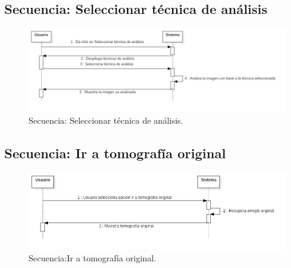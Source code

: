 \documentclass[12pt]{report}
\begin{document}
\subsection{Secuencia: Seleccionar técnica de análisis}
\begin{figure}[H]
\centering
\includegraphics[width = 12 cm, height = 7 cm]{analisis}
\caption{Secuencia: Seleccionar técnica de análisis.}
\end{figure}

\subsection{Secuencia: Ir a tomografía original}
\begin{figure}[H]
\centering
\includegraphics[width = 12 cm, height = 7 cm]{ir_a_tomografia}
\caption{Secuencia:Ir a tomografía original.}
\end{figure}
\end{document}
